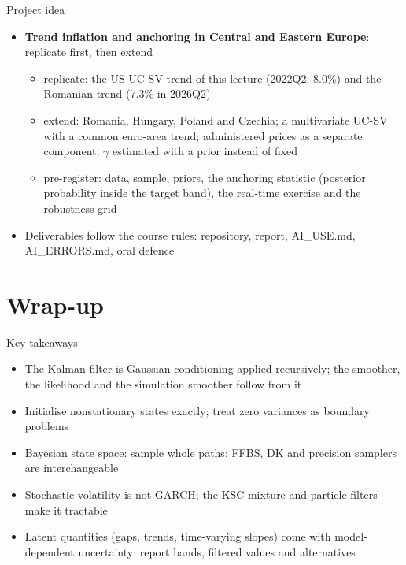 \begin{frame}{Project idea}
\itemsize{\small}
\begin{itemize}
    \item \textbf{Trend inflation and anchoring in Central and Eastern Europe}: replicate first, then extend
    \begin{itemize}
        \item replicate: the US UC-SV trend of this lecture (2022Q2: 8.0\%) and the Romanian trend (7.3\% in 2026Q2)
        \item extend: Romania, Hungary, Poland and Czechia; a multivariate UC-SV with a common euro-area trend; administered prices as a separate component; $\gamma$ estimated with a prior instead of fixed
        \item pre-register: data, sample, priors, the anchoring statistic (posterior probability inside the target band), the real-time exercise and the robustness grid
    \end{itemize}
    \item Deliverables follow the course rules: repository, report, AI\_USE.md, AI\_ERRORS.md, oral defence
\end{itemize}
\end{frame}


\section{Wrap-up}

\begin{frame}{Key takeaways}
\itemsize{\small}
\begin{itemize}
    \item The Kalman filter is Gaussian conditioning applied recursively; the smoother, the likelihood and the simulation smoother follow from it
    \item Initialise nonstationary states exactly; treat zero variances as boundary problems
    \item Bayesian state space: sample whole paths; FFBS, DK and precision samplers are interchangeable
    \item Stochastic volatility is not GARCH; the KSC mixture and particle filters make it tractable
    \item Latent quantities (gaps, trends, time-varying slopes) come with model-dependent uncertainty: report bands, filtered values and alternatives
\end{itemize}
\end{frame}

